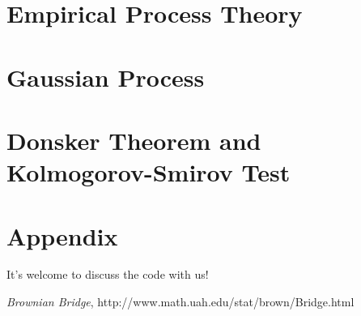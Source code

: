\documentclass[a4paper, 11pt]{article} %
\begin{document}
\tableofcontents
\setcounter{tocdepth}{1}

\section{Empirical Process Theory}


\section{Gaussian Process}



\section{Donsker Theorem and Kolmogorov-Smirov Test}



\section{Appendix}

It's welcome to discuss the code with us!



\begin{thebibliography}{9}

\emph{Brownian Bridge},
http://www.math.uah.edu/stat/brown/Bridge.html

\end{thebibliography}
\end{document}
